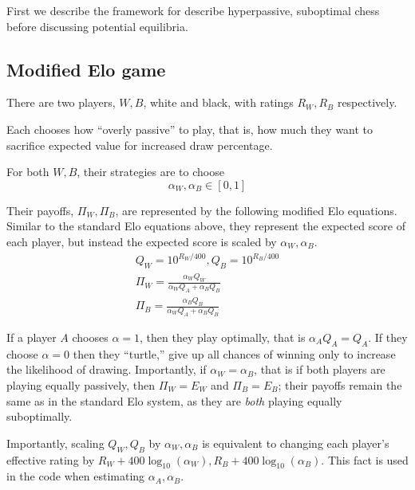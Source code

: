 \documentclass{article}
\begin{document}
First we describe the framework for describe hyperpassive, suboptimal chess before discussing potential equilibria.

\subsection{Modified Elo game}

There are two players, $W, B$, white and black, with ratings $R_W,R_B$ respectively.

Each chooses how ``overly passive'' to play, that is, how much they want to
sacrifice expected value for increased draw percentage.

For both $W,B$, their strategies are to choose $$\alpha_W, \alpha_B \in [0,1]$$

Their payoffs, $\Pi_W,\Pi_B$, are represented by the following modified Elo equations.
Similar to the standard Elo equations above, they represent the expected score of each player,
but instead the expected score is scaled by $\alpha_W, \alpha_B$.
\begin{gather*}
    Q_W = 10^{R_W/400}, Q_B = 10^{R_B/400} \\
    \Pi_W = \frac{\alpha_W Q_W}{\alpha_W Q_A+\alpha_B Q_B}
    \\
    \Pi_B = \frac{\alpha_B Q_B}{\alpha_W Q_A+\alpha_B Q_B}
\end{gather*}

If a player $A$ chooses $\alpha=1$, then they play optimally, that is
$\alpha_A Q_A = Q_A$.
If they choose $\alpha=0$ then they ``turtle,''
give up all chances of winning only to increase the likelihood of drawing.
Importantly, if $\alpha_W=\alpha_B$, that is if both players are playing
equally passively, then $\Pi_W=E_W$ and $\Pi_B=E_B$; their payoffs
remain the same as in the standard Elo system, as they are \textit{both}
playing equally suboptimally.

Importantly, scaling $Q_W,Q_B$ by $\alpha_W,\alpha_B$ is equivalent to changing
each player's effective rating by $R_W + 400\log_{10}(\alpha_W),R_B + 400\log_{10}(\alpha_B)$.
This fact is used in the code when estimating $\alpha_A, \alpha_B$.
\end{document}
